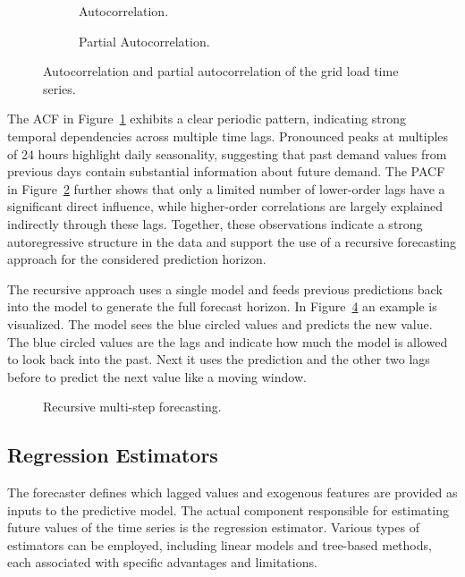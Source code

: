 \begin{figure}[b!]
    \centering
    \begin{subfigure}{0.48\linewidth}
        \centering
        
        \caption{Autocorrelation.}
        \label{fig:autocorrelation}
    \end{subfigure}
    \hfill
    \begin{subfigure}{0.48\linewidth}
        \centering
        
        \caption{Partial Autocorrelation.}
        \label{fig:partial_autocorrelation}
    \end{subfigure}
    \caption{Autocorrelation and partial autocorrelation of the grid load time series.}
    \label{fig:correlation}
\end{figure}
The \ac{ACF} in Figure~\ref{fig:autocorrelation} exhibits a clear periodic pattern, indicating strong temporal dependencies across multiple time lags. Pronounced peaks at multiples of 24 hours highlight daily seasonality, suggesting that past demand values from previous days contain substantial information about future demand. The \ac{PACF} in Figure~\ref{fig:partial_autocorrelation} further shows that only a limited number of lower-order lags have a significant direct influence, while higher-order correlations are largely explained indirectly through these lags. Together, these observations indicate a strong autoregressive structure in the data and support the use of a recursive forecasting approach for the considered prediction horizon.

The recursive approach uses a single model and feeds previous predictions back into the model to generate the full forecast horizon. In Figure~\ref{fig:recursive} an example is visualized. The model sees the blue circled values and predicts the new value. The blue circled values are the lags and indicate how much the model is allowed to look back into the past. Next it uses the prediction and the other two lags before to predict the next value like a moving window.
\begin{figure}[H]
    \centering
    
    \caption{Recursive multi-step forecasting.}
    \label{fig:recursive}
\end{figure}

\subsection{Regression Estimators} 
\label{subsec:regressor}
The forecaster defines which lagged values and exogenous features are provided as inputs to the predictive model. The actual component responsible for estimating future values of the time series is the regression estimator. Various types of estimators can be employed, including linear models and tree-based methods, each associated with specific advantages and limitations.

